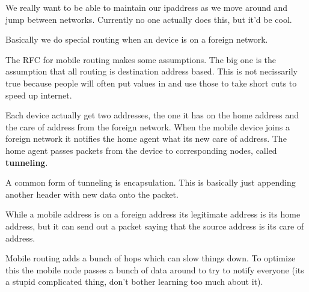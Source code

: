 \documentclass[12pt]{article}
\begin{document}

We really want to be able to maintain our ipaddress as we move around and jump between networks. Currently no one actually does this, but it'd be cool.


Basically we do special routing when an device is on a foreign network.


The RFC for mobile routing makes some assumptions. The big one is the assumption that all routing is destination address based. This is not necissarily true because people will often put values in and use those to take short cuts to speed up internet.




Each device actually get two addresses, the one it has on the home address and the care of address from the foreign network. When the mobile device joins a foreign network it notifies the home agent what its new care of address. The home agent passes packets from the device to corresponding nodes, called \textbf{tunneling}.


A common form of tunneling is encapsulation. This is basically just appending another header with new data onto the packet.


While a mobile address is on a foreign address its legitimate address is its home address, but it can send out a packet saying that the source address is its care of address.


Mobile routing adds a bunch of hops which can slow things down. To optimize this the mobile node passes a bunch of data around to try to notify everyone (its a stupid complicated thing, don't bother learning too much about it).


\end{document}

